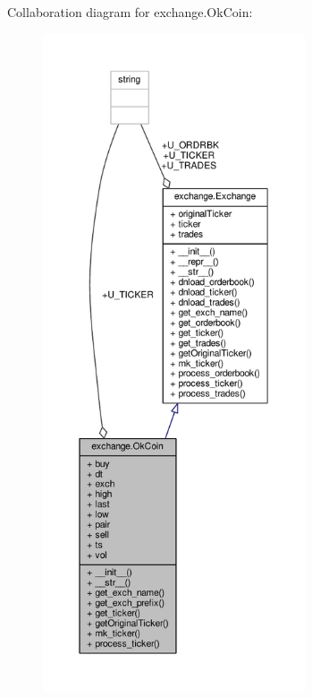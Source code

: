 Collaboration diagram for exchange.\+Ok\+Coin\+:\nopagebreak
\begin{figure}[H]
\begin{center}
\leavevmode
\includegraphics[height=550pt]{classexchange_1_1_ok_coin__coll__graph}
\end{center}
\end{figure}
